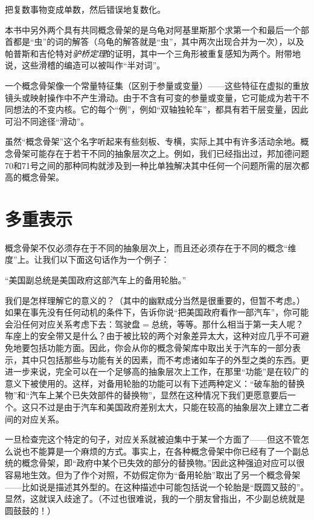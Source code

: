 \begin{block}
把复数事物变成单数，然后错误地复数化。
\end{block}

本书中另外两个具有共同概念骨架的是乌龟对阿基里斯那个求第一个和最后一个部首都是“虫”的词的解答（乌龟的解答就是“虫”，其中两次出现合并为一次），以及帕普斯和吉伦特对\emph{驴桥定理}的证明，其中一个三角形被重复感知为两个。附带地说，这些滑稽的编造可以被叫作“半对词”。

一个概念骨架像一个常量特征集（区别于参量或变量）——这些特征在虚拟的重放镜头或映射操作中不产生滑动。由于不含有可变的参量或变量，它可能成为若干不同想法的不变内核。它的每个“例”，例如“双轴独轮车”，都具有若干层变量，因此可沿不同途径“滑动”。

虽然“概念骨架”这个名字听起来有些刻板、专横，实际上其中有许多活动余地。概念骨架可能存在于若干不同的抽象层次之上。例如，我们已经指出过，邦加德问题70和71号之间的那种同构就涉及到一种比单独解决其中任何一个问题所需的层次都高的概念骨架。

\section{多重表示}

概念骨架不仅必须存在于不同的抽象层次上，而且还必须存在于不同的概念“维度”上。让我们以下面这句话作为一个例子：

\begin{block}
“美国副总统是美国政府这部汽车上的备用轮胎。”
\end{block}

我们是怎样理解它的意义的？（其中的幽默成分当然是很重要的，但暂不考虑。）如果在事先没有任何动机的条件下，告诉你说“把美国政府看作一部汽车”，你可能会沿任何对应关系考虑下去：驾驶盘$=$总统，等等。那什么相当于第一夫人呢？车座上的安全带又是什么？由于被比较的两个对象差异太大，这种对应几乎不可避免地要包括功能方面。因此，你会从你的概念骨架库中取出关于汽车的一部分表示，其中只包括那些与功能有关的因素，而不考虑诸如车子的外型之类的东西。更进一步来说，完全可以在一个足够高的抽象层次上工作，在那里“功能”是在较广的意义下被使用的。这样，对备用轮胎的功能可以有下述两种定义：“破车胎的替换物”和“汽车上某个已失效部件的替换物”，显然在这种情况下我们更愿意要后一个。这只不过是由于汽车和美国政府差别太大，只能在较高的抽象层次上建立二者间的对应关系。

一旦检查完这个特定的句子，对应关系就被迫集中于某一个方面了——但这不管怎么说也不能算是一个麻烦的方式。事实上，在各种概念骨架中你已经有了一个副总统的概念骨架，即“政府中某个已失效的部分的替换物。”因此这种强迫对应可以很容易地生效。但为了作个对照，不妨假定你为“备用轮胎”取出了另一个概念骨架——比如说是描述其外型的。在这种描述中可能包括说一个轮胎是“既圆又鼓的”。显然，这就误入歧途了。（不过也很难说，我的一个朋友曾指出，不少副总统就是圆鼓鼓的！）

